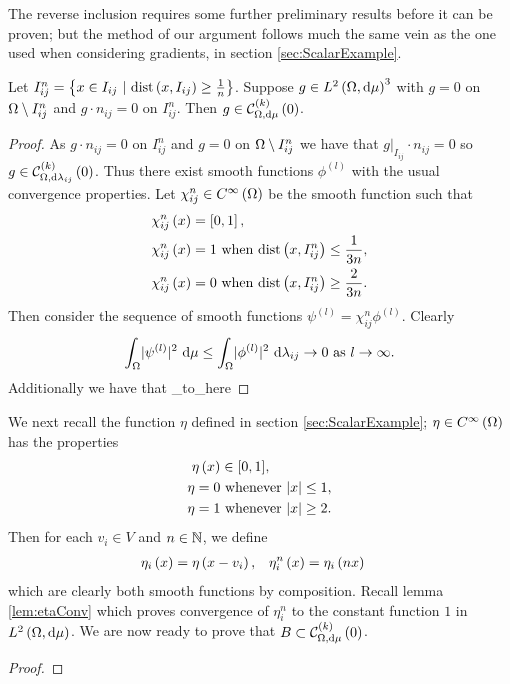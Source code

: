 The reverse inclusion requires some further preliminary results before it can be proven; but the method of our argument follows much the same vein as the one used when considering gradients, in section \ref{sec:ScalarExample}.
\begin{lemma} \label{lem:SegkCurlExtend}
	Let $I_{ij}^n=\clbracs{ x\in I_{ij} \ \vert \ \mathrm{dist}\bracs{x,I_{ij}}\geq\recip{n} }$.
	Suppose $g\in L^{2}\left( \Omega,\mathrm{d}\mu \right)^3$ with $g=0$ on $\Omega\setminus I_{ij}^n$ and $g\cdot n_{ij}=0$ on $I_{ij}^n$.
	Then $g\in\mathcal{C}_{ \Omega, \mathrm{d}\mu}^{(k)}\left( 0 \right)$.
\end{lemma}
\begin{proof}
	As $g\cdot n_{ij}=0$ on $I_{ij}^n$ and $g=0$ on $\Omega\setminus I_{ij}^n$ we have that $g\vert_{I_{ij}}\cdot n_{ij}=0$ so $g\in\mathcal{C}_{ \Omega, \mathrm{d}\lambda_{ij}}^{(k)}\left( 0 \right)$.
	Thus there exist smooth functions $\phi^{(l)}$ with the usual convergence properties.
	Let $\chi_{ij}^n\in C^{\infty}\left( \Omega \right)$ be the smooth function such that
	\begin{align*}
		\chi_{ij}^n\left( x \right) &= \left[ 0,1 \right], \\
		\chi_{ij}^n\left( x \right) &= 1 \text{ when } \mathrm{dist}\left( x,I_{ij}^n \right)\leq \frac{1}{3n}, \\
		\chi_{ij}^n\left( x \right) &= 0 \text{ when } \mathrm{dist}\left( x,I_{ij}^n \right)\geq\frac{2}{3n}.
	\end{align*}
	Then consider the sequence of smooth functions $\psi^{(l)}=\chi_{ij}^n\phi^{(l)}$.
	Clearly
	\begin{align*}
		\int_{\Omega}\lvert \psi^{(l)} \rvert^2 \ \mathrm{d}\mu \leq \int_{\Omega}\lvert \phi^{(l)} \rvert^2 \ \mathrm{d}\lambda_{ij} \rightarrow0 \ \text{as} \ l \rightarrow\infty.
	\end{align*}
	Additionally we have that
	\got_to_here
\end{proof}

We next recall the function $\eta$ defined in section \ref{sec:ScalarExample}; $\eta\in C^{\infty}\left( \Omega \right)$ has the properties
\begin{align*}
	\eta\left( x \right) &\in [0,1], \\
	\eta = 0 &\text{ whenever } \lvert x \rvert\leq 1, \\
	\eta = 1 &\text{ whenever } \lvert x \rvert\geq 2.
\end{align*}
Then for each $v_i\in V$ and $n\in\mathbb{N}$, we define
\begin{align*}
	\eta_i\left( x \right) = \eta\left( x-v_i \right), &\quad \eta_i^n\left( x \right) = \eta_i\left( nx \right)
\end{align*}
which are clearly both smooth functions by composition.
Recall lemma \ref{lem:etaConv} which proves convergence of $\eta_i^n$ to the constant function $1$ in $L^{2}\left( \Omega,\mathrm{d}\mu \right)$.
We are now ready to prove that $B\subset\mathcal{C}_{ \Omega, \mathrm{d}\mu}^{(k)}\left( 0 \right)$.
\begin{prop} \label{prop:BInckCurl0}

\end{prop}
\begin{proof}

\end{proof}


